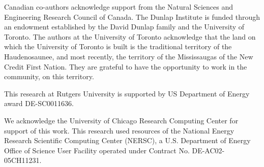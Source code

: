 \documentclass[\docopts]{\docclass}
\begin{document}
Canadian co-authors acknowledge support from the Natural Sciences and Engineering Research Council of Canada.
The Dunlap Institute is funded through an endowment established by the David Dunlap family and the University of Toronto.
The authors at the University of Toronto acknowledge that the land on which the University of Toronto is built is the traditional territory of the Haudenosaunee, and most recently, the territory of the Mississaugas of the New Credit First Nation.
They are grateful to have the opportunity to work in the community, on this territory.

This research at Rutgers University is supported by US Department of Energy award DE-SC0011636.

We acknowledge the University of Chicago Research Computing Center for support of this work.
This research used resources of the National Energy Research Scientific Computing Center (NERSC), a U.S. Department of Energy Office of Science User Facility operated under Contract No. DE-AC02-05CH11231.


%
%




\end{document}
